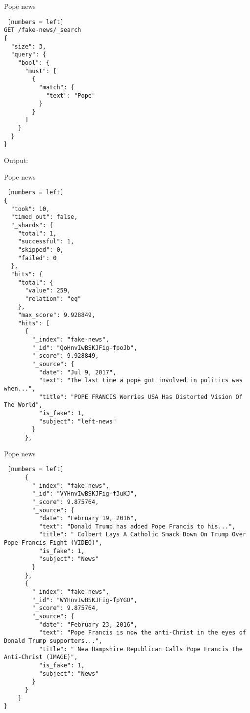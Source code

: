 \begin{algorithm}[ht]
\caption{Pope news}
\begin{lstlisting} [numbers = left]
GET /fake-news/_search
{ 
  "size": 3,
  "query": {
    "bool": {
      "must": [
        {
          "match": {
            "text": "Pope"
          }
        }
      ]
    }
  }
}
\end{lstlisting}
\end{algorithm}
\newpage

Output:
\begin{algorithm}[h!]
\caption{Pope news}
\begin{lstlisting} [numbers = left]
{
  "took": 10,
  "timed_out": false,
  "_shards": {
    "total": 1,
    "successful": 1,
    "skipped": 0,
    "failed": 0
  },
  "hits": {
    "total": {
      "value": 259,
      "relation": "eq"
    },
    "max_score": 9.928849,
    "hits": [
      {
        "_index": "fake-news",
        "_id": "QoHnvIwBSKJFig-fpoJb",
        "_score": 9.928849,
        "_source": {
          "date": "Jul 9, 2017",
          "text": "The last time a pope got involved in politics was when...",
          "title": "POPE FRANCIS Worries USA Has Distorted Vision Of The World",
          "is_fake": 1,
          "subject": "left-news"
        }
      },

\end{lstlisting}
\end{algorithm}
\newpage
\begin{algorithm}[h!]
\caption{Pope news}
\begin{lstlisting} [numbers = left]
      {
        "_index": "fake-news",
        "_id": "VYHnvIwBSKJFig-f3uKJ",
        "_score": 9.875764,
        "_source": {
          "date": "February 19, 2016",
          "text": "Donald Trump has added Pope Francis to his...",
          "title": " Colbert Lays A Catholic Smack Down On Trump Over Pope Francis Fight (VIDEO)",
          "is_fake": 1,
          "subject": "News"
        }
      },
      {
        "_index": "fake-news",
        "_id": "WYHnvIwBSKJFig-fpYGO",
        "_score": 9.875764,
        "_source": {
          "date": "February 23, 2016",
          "text": "Pope Francis is now the anti-Christ in the eyes of Donald Trump supporters...",
          "title": " New Hampshire Republican Calls Pope Francis The Anti-Christ (IMAGE)",
          "is_fake": 1,
          "subject": "News"
        }
      }
    }
}

\end{lstlisting}
\end{algorithm}
\newpage

